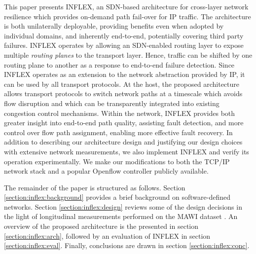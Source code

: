 This paper presents INFLEX, an \ac{SDN}-based architecture for cross-layer network resilience which provides on-demand path fail-over for \ac{IP} traffic. 
The architecture is both unilaterally deployable, providing benefits even when adopted by individual domains, and inherently end-to-end, potentially covering third party failures.
INFLEX operates by allowing an \ac{SDN}-enabled routing layer to expose multiple \emph{routing planes} to the transport layer. 
Hence, traffic can be shifted by one routing plane to another as a response to end-to-end failure detection.
Since INFLEX operates as an extension to the network abstraction provided by \ac{IP}, it can be used by all transport protocols.
At the host, the proposed architecture allows transport protocols to switch network paths at a timescale which avoids flow disruption and which can be transparently integrated into existing congestion control mechanisms.
Within the network, INFLEX provides both greater insight into end-to-end path quality, assisting fault detection, and more control over flow path assignment, enabling more effective fault recovery. 
In addition to describing our architecture design and justifying our design choices with extensive network measurements, we also implement INFLEX and verify its operation experimentally. 
We make our modifications to both the \ac{TCP}/\ac{IP} network stack and a popular Openflow controller \cite{pox} publicly available.

The remainder of the paper is structured as follows.
Section \ref{section:inflex:background} provides a brief background on software-defined networks.
Section \ref{section:inflex:design} reviews some of the design decisions in the light of longitudinal measurements performed on the MAWI dataset \cite{mawi}.
An overview of the proposed architecture is the presented in section \ref{section:inflex:arch}, followed by an evaluation of INFLEX in section \ref{section:inflex:eval}.
Finally, conclusions are drawn in section \ref{section:inflex:conc}.

%


